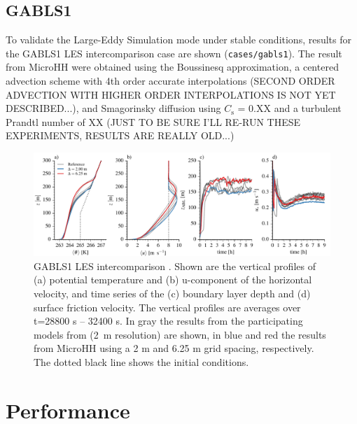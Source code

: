 \documentclass[gmd]{copernicus}
\begin{document}
\subsection{GABLS1}
To validate the Large-Eddy Simulation mode under stable conditions, results for the GABLS1 LES intercomparison case \citep{Beare2006} are shown (\texttt{cases/gabls1}). The result from MicroHH were obtained using the Boussinesq approximation, a centered advection scheme with 4th order accurate interpolations (SECOND ORDER ADVECTION WITH HIGHER ORDER INTERPOLATIONS IS NOT YET DESCRIBED...), and Smagorinsky diffusion using $C_\mathrm{s}$ = 0.XX and a turbulent Prandtl number of XX (JUST TO BE SURE I'LL RE-RUN THESE EXPERIMENTS, RESULTS ARE REALLY OLD...)

\begin{figure}[t]
\vspace*{2mm}
\begin{center}
\includegraphics[width=16.6cm]{figs/gmd_gabls_prof_tser.pdf}
\end{center}
\caption{GABLS1 LES intercomparison \citep{Beare2006}. Shown are the vertical profiles of (a) potential temperature and (b) u-component of the horizontal velocity, and time series of the (c) boundary layer depth and (d) surface friction velocity. The vertical profiles are averages over t=28800 s -- 32400 s. In gray the results from the participating models from  \citep{Beare2006} (2~m resolution) are shown, in blue and red the results from MicroHH using a 2 m and 6.25 m grid spacing, respectively. The dotted black line shows the initial conditions.}
\label{fig:gabls}
\end{figure}

\section{Performance}\label{sec:performance}
\end{document}

